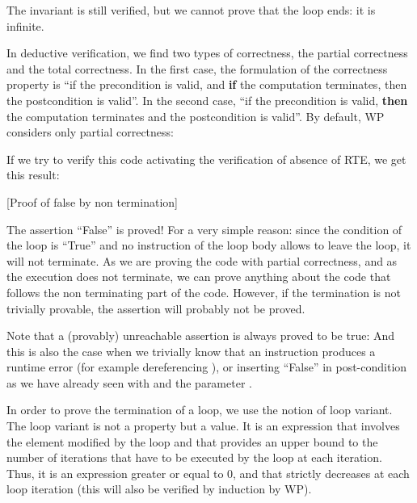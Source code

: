 The invariant is still verified, but we cannot prove that the loop ends:
it is infinite.





In deductive verification, we find two types of correctness, the partial
correctness and the total correctness. In the first case, the
formulation of the correctness property is ``if the precondition is
valid, and \textbf{if} the computation terminates, then the
postcondition is valid''. In the second case, ``if the precondition is
valid, \textbf{then} the computation terminates and the postcondition is
valid''. By default, WP considers only partial correctness:






If we try to verify this code activating the verification of absence of
RTE, we get this result:



[Proof of false by non termination]


The assertion ``False'' is proved! For a very simple reason: since the
condition of the loop is ``True'' and no instruction of the loop body
allows to leave the loop, it will not terminate. As we are proving the
code with partial correctness, and as the execution does not terminate,
we can prove anything about the code that follows the non terminating
part of the code. However, if the termination is not trivially provable,
the assertion will probably not be proved.



\begin{Information}
  Note that a (provably) unreachable assertion is always proved to be true:
  And this is also the case when we trivially know that an instruction
  produces a runtime error (for example dereferencing ), or
  inserting ``False'' in post-condition as we have already seen with
   and the parameter .
\end{Information}


In order to prove the termination of a loop, we use the notion of loop
variant. The loop variant is not a property but a value. It is an
expression that involves the element modified by the loop and that
provides an upper bound to the number of iterations that have to be
executed by the loop at each iteration. Thus, it is an expression
greater or equal to 0, and that strictly decreases at each loop
iteration (this will also be verified by induction by WP).


